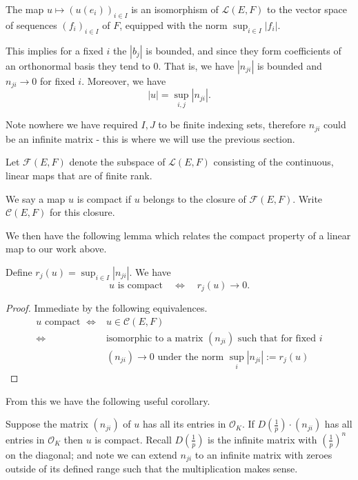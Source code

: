 \begin{proposition}
The map $u \mapsto (u(e_i))_{i \in I}$ is an isomorphism of $\mathcal{L}(E,F)$ to the vector space of sequences $(f_i)_{i \in I}$ of $F$, equipped with the norm $\sup_{i \in I} |f_i|$.
\end{proposition}

This implies for a fixed $i$ the $|b_j|$ is bounded, and since they form coefficients of an orthonormal basis they tend to 0. That is, we have $|n_{ji}|$ is bounded and $n_{ji} \to 0$ for fixed $i$. Moreover, we have
\[
| u | = \sup_{i,j} |n_{ji}|. %
\]

\begin{remark}
    Note nowhere we have required $I,J$ to be finite indexing sets, therefore $n_{ji}$ could be an infinite matrix - this is where we will use the previous section.
\end{remark}

\begin{definition}
    Let $\mathcal{F}(E,F)$ denote the subspace of $\mathcal{L}(E,F)$ consisting of the continuous, linear maps that are of finite rank.

    We say a map $u$ is compact if $u$ belongs to the closure of $\mathcal{F}(E,F)$. Write $\mathcal{C}(E,F)$ for this closure.
\end{definition}

We then have the following lemma which relates the compact property of a linear map to our work above.

\begin{lemma}
    Define $r_j (u) = \sup_{i \in I} |n_{ji} |$. We have
    \[
    u \text{ is compact} \quad \Longleftrightarrow \quad r_j(u) \to 0.
    \]
\end{lemma}

\begin{proof}
    Immediate by the following equivalences.
    \begin{align*}
        u \text{ compact } \iff &u \in \mathcal{C}(E,F) \\
        \iff &\text{isomorphic to a matrix } (n_{ji}) \text{ such that for fixed $i$} \\ & (n_{ji}) \to 0 \text{ under the norm } \sup_i |n_{ji}| := r_j (u)
    \end{align*} \qedhere
\end{proof}

From this we have the following useful corollary.

\begin{corollary}
    Suppose the matrix $(n_{ji})$ of $u$ has all its entries in $\mathcal{O}_K$. If $D(\frac{1}{p}) \cdot(n_{ji})$ has all entries in $\mathcal{O}_K$ then $u$ is compact. Recall $D(\frac{1}{p})$ is the infinite matrix with $(\frac{1}{p})^n$ on the diagonal; and note we can extend $n_{ji}$ to an infinite matrix with zeroes outside of its defined range such that the multiplication makes sense.
\end{corollary}

